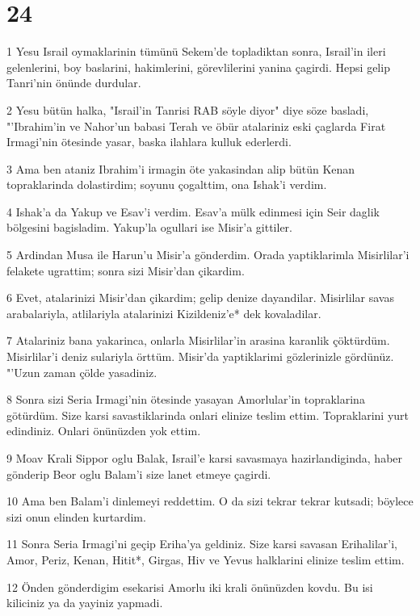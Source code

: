 \chapter{24}

\par 1 Yesu Israil oymaklarinin tümünü Sekem'de topladiktan sonra, Israil'in ileri gelenlerini, boy baslarini, hakimlerini, görevlilerini yanina çagirdi. Hepsi gelip Tanri'nin önünde durdular.
\par 2 Yesu bütün halka, "Israil'in Tanrisi RAB söyle diyor" diye söze basladi, "'Ibrahim'in ve Nahor'un babasi Terah ve öbür atalariniz eski çaglarda Firat Irmagi'nin ötesinde yasar, baska ilahlara kulluk ederlerdi.
\par 3 Ama ben ataniz Ibrahim'i irmagin öte yakasindan alip bütün Kenan topraklarinda dolastirdim; soyunu çogalttim, ona Ishak'i verdim.
\par 4 Ishak'a da Yakup ve Esav'i verdim. Esav'a mülk edinmesi için Seir daglik bölgesini bagisladim. Yakup'la ogullari ise Misir'a gittiler.
\par 5 Ardindan Musa ile Harun'u Misir'a gönderdim. Orada yaptiklarimla Misirlilar'i felakete ugrattim; sonra sizi Misir'dan çikardim.
\par 6 Evet, atalarinizi Misir'dan çikardim; gelip denize dayandilar. Misirlilar savas arabalariyla, atlilariyla atalarinizi Kizildeniz'e* dek kovaladilar.
\par 7 Atalariniz bana yakarinca, onlarla Misirlilar'in arasina karanlik çöktürdüm. Misirlilar'i deniz sulariyla örttüm. Misir'da yaptiklarimi gözlerinizle gördünüz. "'Uzun zaman çölde yasadiniz.
\par 8 Sonra sizi Seria Irmagi'nin ötesinde yasayan Amorlular'in topraklarina götürdüm. Size karsi savastiklarinda onlari elinize teslim ettim. Topraklarini yurt edindiniz. Onlari önünüzden yok ettim.
\par 9 Moav Krali Sippor oglu Balak, Israil'e karsi savasmaya hazirlandiginda, haber gönderip Beor oglu Balam'i size lanet etmeye çagirdi.
\par 10 Ama ben Balam'i dinlemeyi reddettim. O da sizi tekrar tekrar kutsadi; böylece sizi onun elinden kurtardim.
\par 11 Sonra Seria Irmagi'ni geçip Eriha'ya geldiniz. Size karsi savasan Erihalilar'i, Amor, Periz, Kenan, Hitit*, Girgas, Hiv ve Yevus halklarini elinize teslim ettim.
\par 12 Önden gönderdigim esekarisi Amorlu iki krali önünüzden kovdu. Bu isi kiliciniz ya da yayiniz yapmadi.
